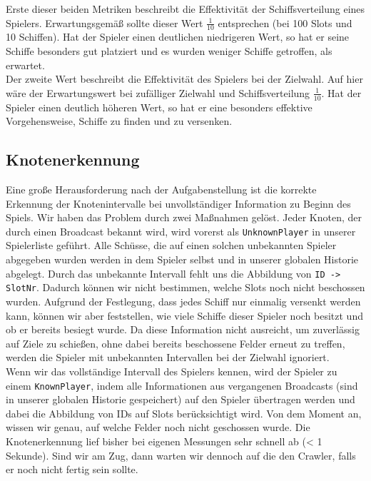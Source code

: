 Erste dieser beiden Metriken beschreibt die Effektivität der Schiffsverteilung eines Spielers. Erwartungsgemäß sollte dieser Wert $ \frac{1}{10} $ entsprechen (bei 100 Slots und 10 Schiffen). Hat der Spieler einen deutlichen niedrigeren Wert, so hat er seine Schiffe besonders gut platziert und es wurden weniger Schiffe getroffen, als erwartet.\\

Der zweite Wert beschreibt die Effektivität des Spielers bei der Zielwahl. Auf hier wäre der Erwartungswert bei zufälliger Zielwahl und Schiffsverteilung  $ \frac{1}{10} $. Hat der Spieler einen deutlich höheren Wert, so hat er eine besonders effektive Vorgehensweise, Schiffe zu finden und zu versenken.\\


\subsection{Knotenerkennung}
Eine große Herausforderung nach der Aufgabenstellung ist die korrekte Erkennung der Knotenintervalle bei unvollständiger Information zu Beginn des Spiels. Wir haben das Problem durch zwei Maßnahmen gelöst. Jeder Knoten, der durch einen Broadcast bekannt wird, wird vorerst als \texttt{UnknownPlayer} in unserer Spielerliste geführt. Alle Schüsse, die auf einen solchen unbekannten Spieler abgegeben wurden werden in dem Spieler selbst und in unserer globalen Historie abgelegt. Durch das unbekannte Intervall fehlt uns die Abbildung von \texttt{ID -> SlotNr}. Dadurch können wir nicht bestimmen, welche Slots noch nicht beschossen wurden. Aufgrund der Festlegung, dass jedes Schiff nur einmalig versenkt werden kann, können wir aber feststellen, wie viele Schiffe dieser Spieler noch besitzt und ob er bereits besiegt wurde. Da diese Information nicht ausreicht, um zuverlässig auf Ziele zu schießen, ohne dabei bereits beschossene Felder erneut zu treffen, werden die Spieler mit unbekannten Intervallen bei der Zielwahl ignoriert.\\

Wenn wir das vollständige Intervall des Spielers kennen, wird der Spieler zu einem \texttt{KnownPlayer}, indem alle Informationen aus vergangenen Broadcasts (sind in unserer globalen Historie gespeichert) auf den Spieler übertragen werden und dabei die Abbildung von IDs auf Slots berücksichtigt wird. Von dem Moment an, wissen wir genau, auf welche Felder noch nicht geschossen wurde. Die Knotenerkennung lief bisher bei eigenen Messungen sehr schnell ab (< 1 Sekunde). Sind wir am Zug, dann warten wir dennoch auf die den Crawler, falls er noch nicht fertig sein sollte.\\

